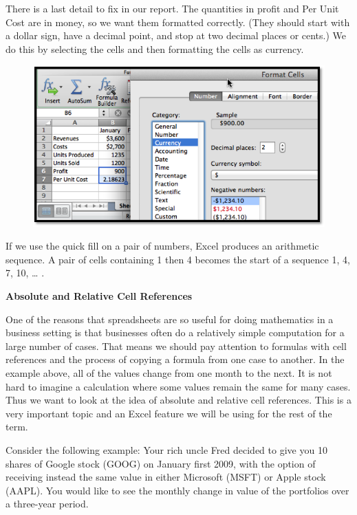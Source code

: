 \documentclass[10pt,]{book}
\newcommand{\terminology}[1]{\textbf{#1}}
\theoremstyle{plain}
\theoremstyle{definition}
\theoremstyle{definition}
\begin{document}
There is a last detail to fix in our report.  The quantities in profit and Per Unit Cost are in money, so we want them formatted correctly.  (They should start with a dollar sign, have a decimal point, and stop at two decimal places or cents.)  We do this by selecting the cells and then formatting the cells as currency.%
\leavevmode%
\begin{figure}
\centering
\includegraphics[width=0.8\linewidth]{images/sec1-3-8.png}
\end{figure}
\par

If we use the quick fill on a pair of numbers, Excel produces an arithmetic sequence.  A pair of cells containing 1 then 4 becomes the start of a sequence 1, 4, 7, 10,  … .%
\par
\terminology{
Absolute and Relative Cell References}%
\par

One of the reasons that spreadsheets are so useful for doing mathematics in a business setting is that businesses often do a relatively simple computation for a large number of cases.  That means we should pay attention to formulas with cell references and the process of copying a formula from one case to another.  In the example above, all of the values change from one month to the next.  It is not hard to imagine a calculation where some values remain the same for many cases.  Thus we want to look at the idea of absolute and relative cell references.  This is a very important topic and an Excel feature we will be using for the rest of the term.%
\par

Consider the following example: Your rich uncle Fred decided to give you 10 shares of Google stock (GOOG) on January first 2009, with the option of receiving instead the same value in either Microsoft (MSFT) or Apple stock (AAPL). You would like to see the monthly change in value of the portfolios over a three-year period.%
\par
\end{document}
